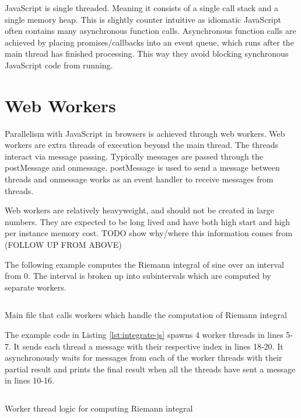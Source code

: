 \documentclass[11pt]{book}
\begin{document}
JavaScript is single threaded. Meaning it consists of a single call stack and a single memory heap. This is slightly counter intuitive as idiomatic JavaScript often contains many asynchronous function calls. Asynchronous function calls are achieved by placing promises/callbacks into an event queue, which runs after the main thread has finished processing. This way they avoid blocking synchronous JavaScript code from running. 



\section{Web Workers}
Parallelism with JavaScript in browsers is achieved through web workers. Web workers are extra threads of execution beyond the main thread. The threads interact via message passing. Typically messages are passed through the postMessage and onmessage. postMessage is used to send a message between threads and onmessage works as an event handler to receive messages from threads. 


Web workers are relatively heavyweight, and should not be created in large numbers. They are expected to be long lived and have both high start and high per instance memory cost. 
TODO show why/where this information comes from (FOLLOW UP FROM ABOVE)

The following example computes the Riemann integral of sine over an interval from 0. The interval is broken up into subintervals which are computed by separate workers.

\begin{listing}[H] 
        \inputminted[fontsize=\small,baselinestretch=0.5,linenos]{javascript}{code/worker/integrate.js}
        \caption{Main file that calls workers which handle the computation of Riemann integral} 
        
        \label{lst:integrate-js}    
\end{listing} 

The example code in Listing \ref{lst:integrate-js} spawns 4 worker threads in lines 5-7. It sends each thread a message with their respective index in lines 18-20. It asynchronously waits for messages from each of the worker threads with their partial result and prints the final result when all the threads have sent a message in lines 10-16.
\begin{listing}[H] 
        \inputminted[fontsize=\small,baselinestretch=0.5,linenos]{javascript}{code/worker/worker.js}
        \caption{Worker thread logic for computing Riemann integral} 
        \label{lst:worker-js}    
\end{listing}    
\end{document}
